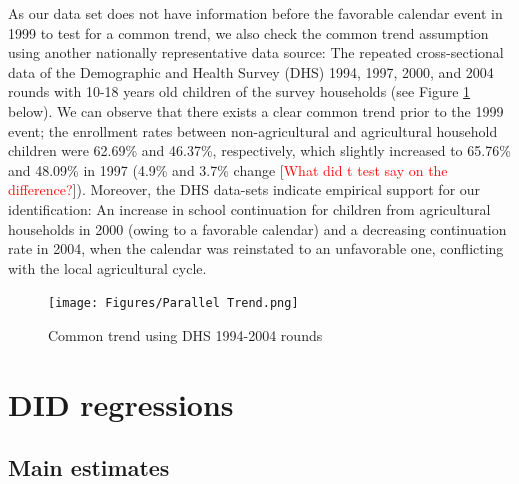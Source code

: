 \documentclass[12pt,letterpaper]{article}
\newcommand{\SAdded}[1]{\textcolor{red}{#1}}
\newcommand{\0}{\ensuremath{\mbox{\boldmath $0$}}}
\begin{document}
As our data set does not have information before the favorable calendar event in 1999 to test for a common trend, we also check the common trend assumption using another nationally representative data source: The repeated cross-sectional data of the Demographic and Health Survey (DHS) 1994, 1997, 2000, and 2004 rounds with 10-18 years old children of the survey households (see Figure \ref{ptrendDHS} below). We can observe that there exists a clear common trend prior to the 1999 event; the enrollment rates between non-agricultural and agricultural household children were 62.69\% and 46.37\%, respectively, which slightly increased to 65.76\% and 48.09\% in 1997 (4.9\% and 3.7\% change [\SAdded{What did t test say on the difference?}]). Moreover, the DHS data-sets indicate empirical support for our identification: An increase in school continuation for children from agricultural households in 2000 (owing to a favorable calendar) and a decreasing continuation rate in 2004, when the calendar was reinstated to an unfavorable one, conflicting with the local agricultural cycle. 


\begin{figure}[h!]
\centering
\texttt{[image: Figures/Parallel Trend.png]}\\
\caption{Common trend using DHS 1994-2004 rounds}
\label{ptrendDHS}
\end{figure}




\section{DID regressions}\label{sec_DID}
\subsection{Main estimates}
\end{document}
